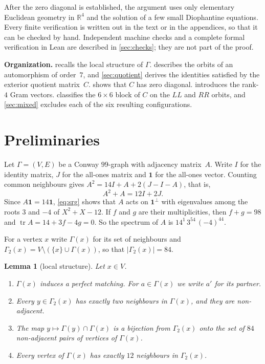 \documentclass[11pt,a4paper]{amsart}
\newtheorem{lemma}[theorem]{Lemma}
\theoremstyle{definition}
\theoremstyle{remark}
\newcommand{\R}{\mathbb{R}}
\newcommand{\one}{\mathbf{1}}
\newcommand{\tr}{\operatorname{tr}}
\begin{document}
After the zero diagonal is established, the argument uses only elementary Euclidean geometry in $\R^4$ and
the solution of a few small Diophantine equations. Every finite verification is written out in the text or
in the appendices, so that it can be checked by hand. Independent machine checks and a complete formal
verification in Lean are described in \cref{sec:checks}; they are not part of the proof.

\medskip\noindent\textbf{Organization.}
 recalls the local structure of $\Gamma$.  describes the orbits of an
automorphism of order~$7$, and \cref{sec:quotient} derives the identities satisfied by the exterior quotient
matrix~$C$.  shows that $C$ has zero diagonal.  introduces the
rank-$4$ Gram vectors.  classifies the $6\times6$ block of $C$ on the $LL$ and $RR$ orbits,
and \cref{sec:mixed} excludes each of the six resulting configurations.

\section{Preliminaries}\label{sec:prelim}

Let $\Gamma=(V,E)$ be a Conway $99$-graph with adjacency matrix~$A$. Write $I$ for the identity matrix, $J$ for
the all-ones matrix and $\one$ for the all-ones vector. Counting common neighbours gives
$A^2=14I+A+2(J-I-A)$, that is,
\begin{equation}\label{eq:srg}
A^2+A=12I+2J .
\end{equation}
Since $A\one=14\one$, \eqref{eq:srg} shows that $A$ acts on $\one^\perp$ with eigenvalues among the roots
$3$ and $-4$ of $X^2+X-12$. If $f$ and $g$ are their multiplicities, then $f+g=98$ and
$\tr A=14+3f-4g=0$. So the spectrum of $A$ is $14^1\,3^{54}\,(-4)^{44}$.

For a vertex $x$ write $\Gamma(x)$ for its set of neighbours and $\Gamma_2(x)=V\setminus(\{x\}\cup\Gamma(x))$,
so that $|\Gamma_2(x)|=84$.

\begin{lemma}[local structure]\label{lem:local}
Let $x\in V$.
\begin{enumerate}[label=(\alph*)]
\item $\Gamma(x)$ induces a perfect matching. For $a\in\Gamma(x)$ we write $a'$ for its partner.
\item Every $y\in\Gamma_2(x)$ has exactly two neighbours in $\Gamma(x)$, and they are non-adjacent.
\item The map $y\mapsto\Gamma(y)\cap\Gamma(x)$ is a bijection from $\Gamma_2(x)$ onto the set of $84$
non-adjacent pairs of vertices of $\Gamma(x)$.
\item Every vertex of $\Gamma(x)$ has exactly $12$ neighbours in $\Gamma_2(x)$.
\end{enumerate}
\end{lemma}
\end{document}
